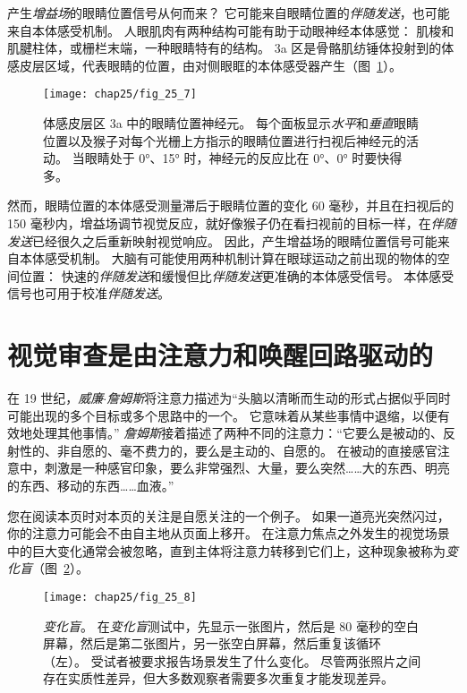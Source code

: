 产生\textit{增益场}的眼睛位置信号从何而来？
它可能来自眼睛位置的\textit{伴随发送}，也可能来自本体感受机制。
人眼肌肉有两种结构可能有助于动眼神经本体感觉：
肌梭和肌腱柱体，或栅栏末端，一种眼睛特有的结构。
3a 区是骨骼肌纺锤体投射到的体感皮层区域，代表眼睛的位置，由对侧眼眶的本体感受器产生（图~\ref{fig:25_7}）。


\begin{figure}[htbp]
	\centering
	\texttt{[image: chap25/fig\_25\_7]}
	\caption{体感皮层区 3a 中的眼睛位置神经元。
		每个面板显示\textit{水平}和\textit{垂直}眼睛位置以及猴子对每个光栅上方指示的眼睛位置进行扫视后神经元的活动。
		当眼睛处于 0°、15° 时，神经元的反应比在 0°、0° 时要快得多。}
	\label{fig:25_7}
\end{figure}


然而，眼睛位置的本体感受测量滞后于眼睛位置的变化 60 毫秒，并且在扫视后的 150 毫秒内，增益场调节视觉反应，就好像猴子仍在看扫视前的目标一样，在\textit{伴随发送}已经很久之后重新映射视觉响应。
因此，产生增益场的眼睛位置信号可能来自本体感受机制。
大脑有可能使用两种机制计算在眼球运动之前出现的物体的空间位置：
快速的\textit{伴随发送}和缓慢但比\textit{伴随发送}更准确的本体感受信号。
本体感受信号也可用于校准\textit{伴随发送}。



\section{视觉审查是由注意力和唤醒回路驱动的}

在 19 世纪，\textit{威廉$\cdot$詹姆斯}将注意力描述为“头脑以清晰而生动的形式占据似乎同时可能出现的多个目标或多个思路中的一个。
它意味着从某些事情中退缩，以便有效地处理其他事情。” 
\textit{詹姆斯}接着描述了两种不同的注意力：“它要么是被动的、反射性的、非自愿的、毫不费力的，要么是主动的、自愿的。
在被动的直接感官注意中，刺激是一种感官印象，要么非常强烈、大量，要么突然……大的东西、明亮的东西、移动的东西……血液。”


您在阅读本页时对本页的关注是自愿关注的一个例子。
如果一道亮光突然闪过，你的注意力可能会不由自主地从页面上移开。
在注意力焦点之外发生的视觉场景中的巨大变化通常会被忽略，直到主体将注意力转移到它们上，这种现象被称为\textit{变化盲}（图~\ref{fig:25_8}）。


\begin{figure}[htbp]
	\centering
	\texttt{[image: chap25/fig\_25\_8]}
	\caption{\textit{变化盲}。
		在\textit{变化盲}测试中，先显示一张图片，然后是 80 毫秒的空白屏幕，然后是第二张图片，另一张空白屏幕，然后重复该循环（左）。
		受试者被要求报告场景发生了什么变化。
		尽管两张照片之间存在实质性差异，但大多数观察者需要多次重复才能发现差异。}
	\label{fig:25_8}
\end{figure}


